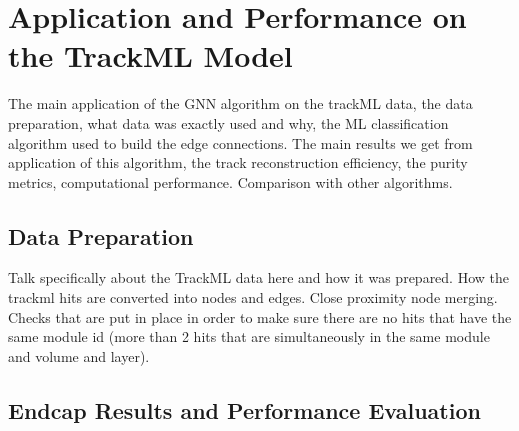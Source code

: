 
\chapter{Application and Performance on the TrackML Model}
\label{chapter-6}


The main application of the GNN algorithm on the trackML data, the data preparation, what data was exactly used and why, the ML classification algorithm used to build the edge connections. The main results we get from application of this algorithm, the track reconstruction efficiency, the purity metrics, computational performance. Comparison with other algorithms.


\section{Data Preparation}
Talk specifically about the TrackML data here and how it was prepared. How the trackml hits are converted into nodes and edges. Close proximity node merging. Checks that are put in place in order to make sure there are no hits that have the same module id (more than 2 hits that are simultaneously in the same module and volume and layer).

\section{Endcap Results and Performance Evaluation}



